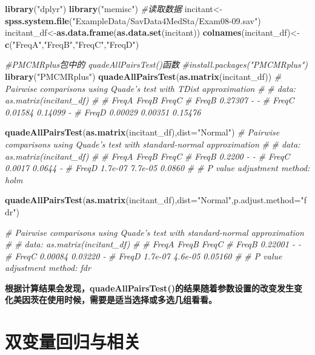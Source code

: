 \documentclass[
]{article}
\newenvironment{Shaded}{\begin{snugshade}}{\end{snugshade}}
\newcommand{\CommentTok}[1]{\textcolor[rgb]{0.56,0.35,0.01}{\textit{#1}}}
\newcommand{\DataTypeTok}[1]{\textcolor[rgb]{0.13,0.29,0.53}{#1}}
\newcommand{\KeywordTok}[1]{\textcolor[rgb]{0.13,0.29,0.53}{\textbf{#1}}}
\newcommand{\NormalTok}[1]{#1}
\newcommand{\StringTok}[1]{\textcolor[rgb]{0.31,0.60,0.02}{#1}}
\begin{document}
\begin{Shaded}
\begin{Highlighting}[]
\KeywordTok{library}\NormalTok{(}\StringTok{"dplyr"}\NormalTok{)}
\KeywordTok{library}\NormalTok{(}\StringTok{"memisc"}\NormalTok{)}
\CommentTok{#读取数据}
\NormalTok{incitant<-}\KeywordTok{spss.system.file}\NormalTok{(}\StringTok{"ExampleData/SavData4MedSta/Exam08-09.sav"}\NormalTok{)}
\NormalTok{incitant_df<-}\KeywordTok{as.data.frame}\NormalTok{(}\KeywordTok{as.data.set}\NormalTok{(incitant))}
\KeywordTok{colnames}\NormalTok{(incitant_df)<-}\KeywordTok{c}\NormalTok{(}\StringTok{"FreqA"}\NormalTok{,}\StringTok{"FreqB"}\NormalTok{,}\StringTok{"FreqC"}\NormalTok{,}\StringTok{"FreqD"}\NormalTok{)}

\CommentTok{#PMCMRplus包中的 quadeAllPairsTest()函数}
\CommentTok{#install.packages("PMCMRplus")}
\KeywordTok{library}\NormalTok{(}\StringTok{"PMCMRplus"}\NormalTok{)}
\KeywordTok{quadeAllPairsTest}\NormalTok{(}\KeywordTok{as.matrix}\NormalTok{(incitant_df))}
\CommentTok{#   Pairwise comparisons using Quade's test with TDist approximation}
\CommentTok{# }
\CommentTok{# data: as.matrix(incitant_df)}
\CommentTok{# }
\CommentTok{#       FreqA   FreqB   FreqC  }
\CommentTok{# FreqB 0.27307 -       -      }
\CommentTok{# FreqC 0.01584 0.14099 -      }
\CommentTok{# FreqD 0.00029 0.00351 0.15476}

\KeywordTok{quadeAllPairsTest}\NormalTok{(}\KeywordTok{as.matrix}\NormalTok{(incitant_df),}\DataTypeTok{dist=}\StringTok{"Normal"}\NormalTok{)}
\CommentTok{#   Pairwise comparisons using Quade's test with standard-normal approximation}
\CommentTok{# }
\CommentTok{# data: as.matrix(incitant_df)}
\CommentTok{# }
\CommentTok{#       FreqA   FreqB   FreqC }
\CommentTok{# FreqB 0.2200  -       -     }
\CommentTok{# FreqC 0.0017  0.0644  -     }
\CommentTok{# FreqD 1.7e-07 7.7e-05 0.0860}
\CommentTok{# }
\CommentTok{# P value adjustment method: holm}

\KeywordTok{quadeAllPairsTest}\NormalTok{(}\KeywordTok{as.matrix}\NormalTok{(incitant_df),}\DataTypeTok{dist=}\StringTok{"Normal"}\NormalTok{,}\DataTypeTok{p.adjust.method=}\StringTok{"fdr"}\NormalTok{)}

\CommentTok{#   Pairwise comparisons using Quade's test with standard-normal approximation}
\CommentTok{# }
\CommentTok{# data: as.matrix(incitant_df)}
\CommentTok{# }
\CommentTok{#       FreqA   FreqB   FreqC  }
\CommentTok{# FreqB 0.22001 -       -      }
\CommentTok{# FreqC 0.00084 0.03220 -      }
\CommentTok{# FreqD 1.7e-07 4.6e-05 0.05160}
\CommentTok{# }
\CommentTok{# P value adjustment method: fdr}
\end{Highlighting}
\end{Shaded}

\textbf{根据计算结果会发现，quadeAllPairsTest()的结果随着参数设置的改变发生变化美因茨在使用时候，需要是适当选择或多选几组看看。}

\hypertarget{ux53ccux53d8ux91cfux56deux5f52ux4e0eux76f8ux5173}{%
\section{双变量回归与相关}\label{ux53ccux53d8ux91cfux56deux5f52ux4e0eux76f8ux5173}}
\end{document}
